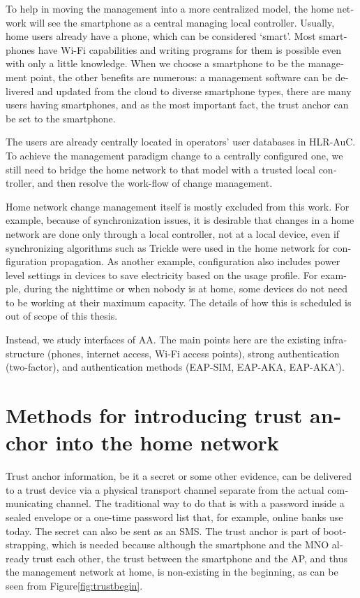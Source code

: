 \documentclass[12pt,a4paper,english]{tutthesis}
\begin{document}
\begin{otherlanguage}{english}
To help in moving the management into a more centralized
model, the home network will see the smartphone as a central managing local
controller.
Usually, home users already have a phone, which can be considered 
`smart'. Most smartphones have Wi-Fi capabilities and writing programs
for them is possible even with only a little knowledge.
When we choose a smartphone to be the management point, the other benefits are
numerous:  a management software can be delivered and
updated from the cloud to diverse smartphone types, 
there are many users having smartphones,
and as the most important fact, the trust anchor can be set to the smartphone.

The users are already  centrally located  in operators' user databases
in HLR-AuC.  To achieve the management paradigm change to a centrally configured one,
we still need to bridge the home network to that model with a trusted local controller,
and then resolve the work-flow of change management.


Home network change management itself is mostly excluded from this work.
For example, because of synchronization issues,
it is desirable that changes in a home network are done only through
a local controller, not at a local device, even 
if synchronizing algorithms such as Trickle \cite{rfc6206} were used in
the home network for configuration propagation. As another example,
configuration also includes
power level settings in devices to save electricity based on the usage
profile. For example, during the nighttime or when nobody is at home, some
devices do not need to be working at their maximum capacity. The 
details of how this is scheduled is out of scope of this thesis.

Instead, we study interfaces of AA.  The main points here are the existing
infrastructure (phones, internet access, Wi-Fi access points),  strong
authentication (two-factor), and authentication methods
(EAP-SIM, EAP-AKA, EAP-AKA').

\section{Methods for introducing trust anchor into the home network}
\label{sec-3-3}
\label{sec:altmethods}

 Trust anchor information, be it a secret or some
other evidence, can be delivered to a trust device via a physical
transport channel separate from the actual communicating channel.
The traditional way to do that is with a password inside a sealed
envelope or a one-time password list that, for example, online banks 
use today. The secret can also be sent as an SMS.
 The trust anchor
is part of bootstrapping, which is needed because although the
smartphone and the MNO already trust each other, the trust between the
smartphone and the AP, and thus the management network at home, is
non-existing in the beginning, as can be seen from
Figure\ref{fig:trustbegin}.


\end{otherlanguage}
\end{document}
